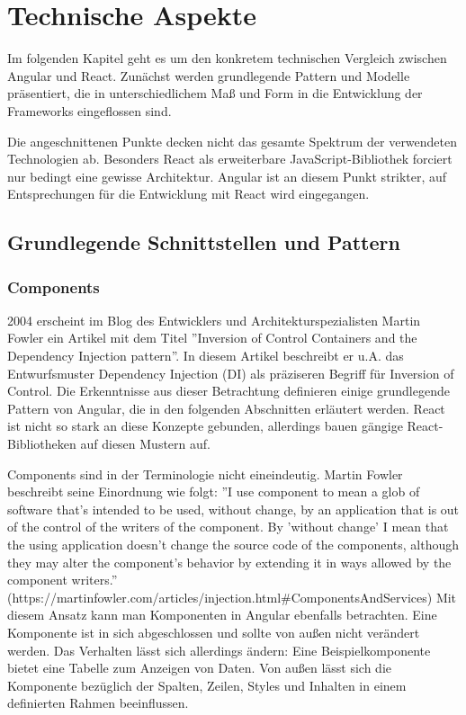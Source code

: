 \chapter{Technische Aspekte}
Im folgenden Kapitel geht es um den konkretem technischen Vergleich zwischen Angular und React. Zunächst werden grundlegende Pattern und Modelle präsentiert, die in unterschiedlichem Maß und Form in die Entwicklung der Frameworks eingeflossen sind.

Die angeschnittenen Punkte decken nicht das gesamte Spektrum der verwendeten Technologien ab. Besonders React als erweiterbare JavaScript-Bibliothek forciert nur bedingt eine gewisse Architektur. Angular ist an diesem Punkt strikter, auf Entsprechungen für die Entwicklung mit React wird eingegangen.
\section{Grundlegende Schnittstellen und Pattern}
\subsection{Components}
2004 erscheint im Blog des Entwicklers und Architekturspezialisten Martin Fowler ein Artikel mit dem Titel ''Inversion of Control Containers and the Dependency Injection pattern''. In diesem Artikel beschreibt er u.A. das Entwurfsmuster Dependency Injection (DI) als präziseren Begriff für Inversion of Control. Die Erkenntnisse aus dieser Betrachtung definieren einige grundlegende Pattern von Angular, die in den folgenden Abschnitten erläutert werden. React ist nicht so stark an diese Konzepte gebunden, allerdings bauen gängige React-Bibliotheken auf diesen Mustern auf.

Components sind in der Terminologie nicht eineindeutig. Martin Fowler beschreibt seine Einordnung wie folgt: ''I use component to mean a glob of software that's intended to be used, without change, by an application that is out of the control of the writers of the component. By 'without change' I mean that the using application doesn't change the source code of the components, although they may alter the component's behavior by extending it in ways allowed by the component writers.''
(https://martinfowler.com/articles/injection.html\#ComponentsAndServices)
Mit diesem Ansatz kann man Komponenten in Angular ebenfalls betrachten. Eine Komponente ist in sich abgeschlossen und sollte von außen nicht verändert werden. Das Verhalten lässt sich allerdings ändern: Eine Beispielkomponente bietet eine Tabelle zum Anzeigen von Daten. Von außen lässt sich die Komponente bezüglich der Spalten, Zeilen, Styles und Inhalten in einem definierten Rahmen beeinflussen.
